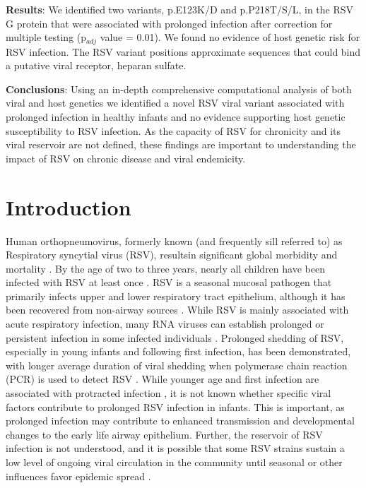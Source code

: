 \documentclass{article} %
\begin{document}
\noindent \textbf{Results}: 
We identified two variants, p.E123K/D and p.P218T/S/L, in the RSV G protein that were associated with prolonged infection after correction for multiple testing (p$_{adj}$ value = 0.01). We found no evidence of host genetic risk for RSV infection. The RSV variant positions approximate sequences that could bind a putative viral receptor, heparan sulfate.

\noindent \textbf{Conclusions}: 
Using an in-depth comprehensive computational analysis of both viral and host genetics we identified a novel RSV viral variant associated with prolonged infection in healthy infants and no evidence supporting host genetic susceptibility to RSV infection. As the capacity of RSV for chronicity and its viral reservoir are not defined, these findings are important to understanding the impact of RSV on chronic disease and viral endemicity.

\section{Introduction}
Human orthopneumovirus, formerly known (and frequently sill referred to) as Respiratory syncytial virus (RSV), resultsin significant global morbidity and mortality 
\citep{hall_burden_2009}.
By the age of two to three years, nearly all children have been infected with RSV at least once 
\citep{glezen1986risk}.
RSV is a seasonal mucosal pathogen that primarily infects upper and lower respiratory tract epithelium, although it has been recovered from non-airway sources 
\citep{bokun_respiratory_2019, cubie_detection_1997, nadal_isolation_1990, odonnell_respiratory_1998, rezaee_respiratory_2011, rohwedder_detection_1998}. 
While RSV is mainly associated with acute respiratory infection, many RNA viruses can establish prolonged or persistent infection in some infected individuals \citep{randall2017within}. 
Prolonged shedding of RSV, especially in young infants and following first infection, has been demonstrated, with longer average duration of viral shedding when polymerase chain reaction (PCR) is used to detect RSV 
\citep{munywoki_influence_2015}.
While younger age and first infection are associated with protracted infection 
\citep{bagga2018unrecognized, glezen1986risk}, 
it is not known whether specific viral factors contribute to prolonged RSV infection in infants. 
This is important, as prolonged infection may contribute to enhanced transmission and developmental changes to the early life airway epithelium. 
Further, the reservoir of RSV infection is not understood, and it is possible that some RSV strains sustain a low level of ongoing viral circulation in the community until seasonal or other influences favor epidemic spread 
\citep{okiro2010duration}.
\end{document}
